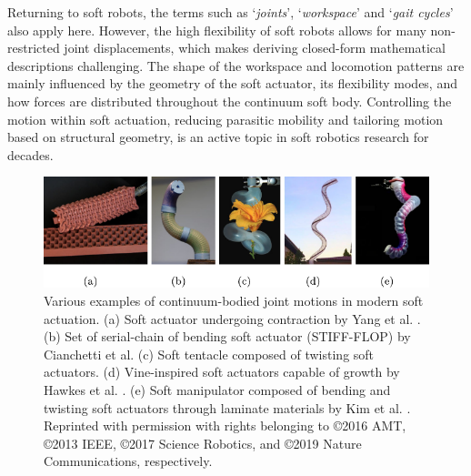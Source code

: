 Returning to soft robots, the terms such as `\textit{joints}', `\textit{workspace}' and `\textit{gait cycles}' also apply here. However, the high flexibility of soft robots allows for many non-restricted joint displacements, which makes deriving closed-form mathematical descriptions challenging. The shape of the workspace and locomotion patterns are mainly influenced by the geometry of the soft actuator, its flexibility modes, and how forces are distributed throughout the continuum soft body. Controlling the motion within soft actuation, reducing parasitic mobility and tailoring motion based on structural geometry, is an active topic in soft robotics research for decades. \\

\begin{figure}[!t]
  \centering
  \includegraphics*[width=\textwidth]{./pdf/thesis-figurex-1-2.pdf}
  \vspace{-6mm}
  \caption{\small Various examples of continuum-bodied joint motions in modern soft actuation. (a) Soft actuator undergoing contraction by Yang et al. \cite{Yang2016}. (b) Set of serial-chain of bending soft actuator (STIFF-FLOP) by Cianchetti et al. \cite{Cianchetti2013Nov,Cianchetti2014} (c) Soft tentacle composed of twisting soft actuators. (d) Vine-inspired soft actuators capable of growth by Hawkes et al. \cite{Hawkes2017}. (e) Soft manipulator composed of bending and twisting soft actuators through laminate materials by Kim et al. \cite{Kim2019Aug}. Reprinted with permission with rights belonging to \copyright2016 AMT, \copyright2013 IEEE, \copyright2017 Science Robotics, and \copyright2019 Nature Communications, respectively.}
  \vspace{-4mm}
  \label{fig:C0:actuationtypes}
\end{figure}
%
\vspace{-4mm}
